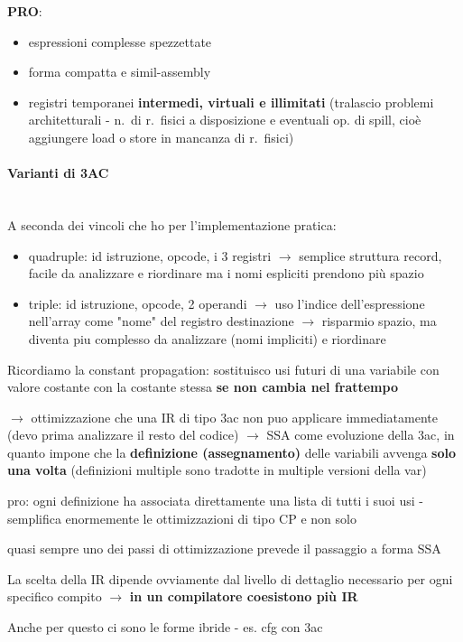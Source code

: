 \textbf{PRO}:
\begin{itemize}
  \item espressioni complesse spezzettate
  \item forma compatta e simil-assembly
  \item registri temporanei \textbf{intermedi, virtuali e illimitati} (tralascio problemi architetturali - n.~di r.~fisici a disposizione e eventuali op. di spill, cio\`e aggiungere load o store in mancanza di r.~fisici)
\end{itemize}

\paragraph{Varianti di 3AC}~\\

A seconda dei vincoli che ho per l'implementazione pratica:

\begin{itemize}
  \item quadruple: id istruzione, opcode, i 3 registri $\rightarrow$ semplice struttura record, facile da analizzare e riordinare ma i nomi espliciti prendono pi\`u spazio
  \item triple: id istruzione, opcode, 2 operandi $\rightarrow$ uso l'indice dell'espressione nell'array come "nome" del registro destinazione $\rightarrow$ risparmio spazio, ma diventa piu complesso da analizzare (nomi impliciti) e riordinare
\end{itemize}


Ricordiamo la constant propagation: sostituisco usi futuri di una variabile con valore costante con la costante stessa \textbf{se non cambia nel frattempo}

$\rightarrow$ ottimizzazione che una IR di tipo 3ac non puo applicare immediatamente (devo prima analizzare il resto del codice) $\rightarrow$ SSA come evoluzione della 3ac, in quanto impone che la \textbf{definizione (assegnamento)} delle variabili avvenga \textbf{solo una volta} (definizioni multiple sono tradotte in multiple versioni della var)

pro: ogni definizione ha associata direttamente una lista di tutti i suoi usi - semplifica enormemente le ottimizzazioni di tipo CP e non solo

quasi sempre uno dei passi di ottimizzazione prevede il passaggio a forma SSA

\begin{emphasize}
  La scelta della IR dipende ovviamente dal livello di dettaglio necessario per ogni specifico compito $\rightarrow$ \textbf{in un compilatore coesistono pi\`u IR}

  \noindent Anche per questo ci sono le forme ibride - es. cfg con 3ac
\end{emphasize}

